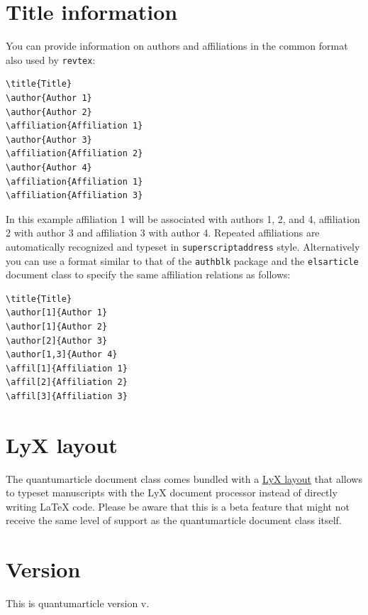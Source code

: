 \documentclass[a4paper,twocolumn,11pt,accepted=2017-05-09]{quantumarticle}
\begin{document}
\section{Title information}
\label{sec:title-information}
You can provide information on authors and affiliations in the common format also used by \texttt{revtex}:
\begin{verbatim}
\title{Title}
\author{Author 1}
\author{Author 2}
\affiliation{Affiliation 1}
\author{Author 3}
\affiliation{Affiliation 2}
\author{Author 4}
\affiliation{Affiliation 1}
\affiliation{Affiliation 3}
\end{verbatim}
In this example affiliation 1 will be associated with authors 1, 2, and 4, affiliation 2 with author 3 and affiliation 3 with author 4.
Repeated affiliations are automatically recognized and typeset in \texttt{superscriptaddress} style.
Alternatively you can use a format similar to that of the \texttt{authblk} package and the \texttt{elsarticle} document class to specify the same affiliation relations as follows:
\begin{verbatim}
\title{Title}
\author[1]{Author 1}
\author[1]{Author 2}
\author[2]{Author 3}
\author[1,3]{Author 4}
\affil[1]{Affiliation 1}
\affil[2]{Affiliation 2}
\affil[3]{Affiliation 3}
\end{verbatim}

\section{LyX layout}
\label{sec:lyx-layout}

The quantumarticle document class comes bundled with a \href{https://raw.githubusercontent.com/quantum-journal/quantum-journal/master/quantum-lyx-template.lyx}{LyX layout} that allows to typeset manuscripts with the LyX document processor instead of directly writing LaTeX code. Please be aware that this is a beta feature that might not receive the same level of support as the quantumarticle document class itself.

\section{Version}
\label{sec:version}
This is quantumarticle version v\quantumarticleversion.
\end{document}
